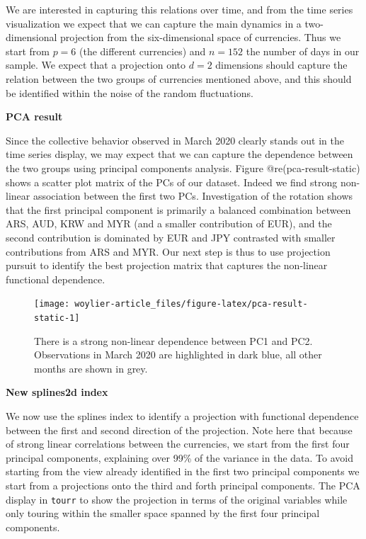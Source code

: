 We are interested in capturing this relations over time, and from the
time series visualization we expect that we can capture the main
dynamics in a two-dimensional projection from the six-dimensional space
of currencies. Thus we start from \(p=6\) (the different currencies) and
\(n=152\) the number of days in our sample. We expect that a projection
onto \(d=2\) dimensions should capture the relation between the two
groups of currencies mentioned above, and this should be identified
within the noise of the random fluctuations.

\textbf{PCA result}

Since the collective behavior observed in March 2020 clearly stands out
in the time series display, we may expect that we can capture the
dependence between the two groups using principal components analysis.
Figure @re(pca-result-static) shows a scatter plot matrix of the PCs of
our dataset. Indeed we find strong non-linear association between the
first two PCs. Investigation of the rotation shows that the first
principal component is primarily a balanced combination between ARS,
AUD, KRW and MYR (and a smaller contribution of EUR), and the second
contribution is dominated by EUR and JPY contrasted with smaller
contributions from ARS and MYR. Our next step is thus to use projection
pursuit to identify the best projection matrix that captures the
non-linear functional dependence.

\begin{Schunk}
\begin{figure}

{\centering \texttt{[image: woylier-article\_files/figure-latex/pca-result-static-1]} 

}

\caption[There is a strong non-linear dependence between PC1 and PC2]{There is a strong non-linear dependence between PC1 and PC2. Observations in March 2020 are highlighted in dark blue, all other months are shown in grey.}\label{fig:pca-result-static}
\end{figure}
\end{Schunk}

\textbf{New splines2d index}

We now use the splines index to identify a projection with functional
dependence between the first and second direction of the projection.
Note here that because of strong linear correlations between the
currencies, we start from the first four principal components,
explaining over 99\% of the variance in the data. To avoid starting from
the view already identified in the first two principal components we
start from a projections onto the third and forth principal components.
The PCA display in \texttt{tourr} to show the projection in terms of the
original variables while only touring within the smaller space spanned
by the first four principal components.

